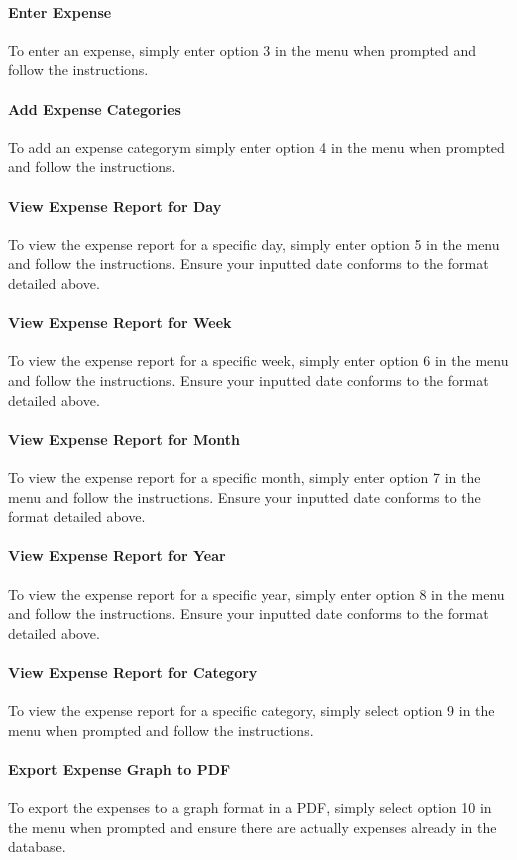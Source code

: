 \documentclass[11pt]{article}
\begin{document}
  \paragraph{Enter Expense}
  To enter an expense, simply enter option 3 in the menu when prompted and follow the instructions.
  \paragraph{Add Expense Categories}
  To add an expense categorym simply enter option 4 in the menu when prompted and follow the instructions.
  \paragraph{View Expense Report for Day}
  To view the expense report for a specific day, simply enter option 5 in the menu and follow the instructions. Ensure your inputted date conforms to the format detailed above.
  \paragraph{View Expense Report for Week}
  To view the expense report for a specific week, simply enter option 6 in the menu and follow the instructions. Ensure your inputted date conforms to the format detailed above.
  \paragraph{View Expense Report for Month}
  To view the expense report for a specific month, simply enter option 7 in the menu and follow the instructions. Ensure your inputted date conforms to the format detailed above.
  \paragraph{View Expense Report for Year}
  To view the expense report for a specific year, simply enter option 8 in the menu and follow the instructions. Ensure your inputted date conforms to the format detailed above.
  \paragraph{View Expense Report for Category}
  To view the expense report for a specific category, simply select option 9 in the menu when prompted and follow the instructions.
  \paragraph{Export Expense Graph to PDF}
  To export the expenses to a graph format in a PDF, simply select option 10 in the menu when prompted and ensure there are actually expenses already in the database.
\end{document}
